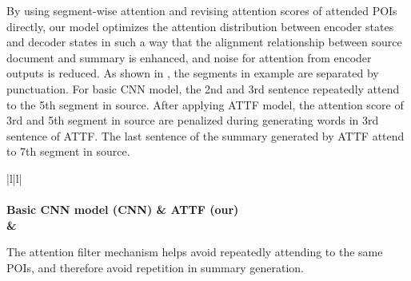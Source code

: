 By using segment-wise attention and revising attention scores of attended POIs directly,
our model optimizes the
attention distribution between encoder states and decoder states in such a way that
the alignment relationship between source document and summary is enhanced, 
and noise for attention from encoder outputs is reduced. 
As shown in , the segments in example are separated by punctuation.
For basic CNN model, the 2nd and 3rd sentence repeatedly attend to 
the 5th segment in source.
After applying ATTF model, 
the attention score of 3rd and 5th segment in source are penalized 
during generating words in 3rd sentence of ATTF.
The last sentence of the summary generated by ATTF attend to 7th segment in source.

\begin{table}[th!]
\begin{center}
\caption{\label{tab:attn_exp} Summary generated by the basic CNN model and ATTF model}
\begin{tabular}{|l|l|}%
\hline 
{} \\
\hline
{} \\
\hline 
\bf Basic CNN model (CNN) & \bf ATTF (our) \\
\hline 
{} 
&  \\
\hline
\end{tabular}
\end{center}
\end{table}
The attention filter mechanism helps avoid repeatedly attending to the same POIs, and therefore avoid repetition in summary generation.


